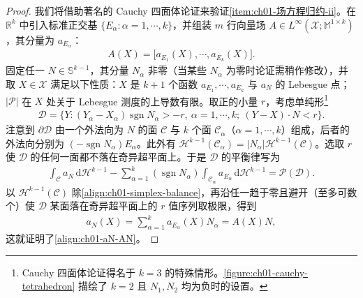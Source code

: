 \documentclass[../../main.tex]{subfiles}
\begin{document}
\begin{proof}
我们将借助著名的 Cauchy 四面体论证来验证\cref{item:ch01-场方程归约-ii}。在 $\mathbb{R}^{k}$ 中引入标准正交基 $\{E_{\alpha}:\alpha=1,\cdots,k\}$，并组装 $m$ 行向量场 $A\in L^{\infty}(\mathscr{X};\mathbb{M}^{1\times k})$，其分量为 $a_{E_{\alpha}}$：
\begin{align}
A(X)=\bigl[a_{E_{1}}(X),\cdots,a_{E_{k}}(X)\bigr].\label{align:ch01-A-components}
\end{align}
固定任一 $N\in\mathbb{S}^{k-1}$，其分量 $N_{\alpha}$ 非零（当某些 $N_{\alpha}$ 为零时论证需稍作修改），并取 $X\in\mathscr{X}$ 满足以下性质：$X$ 是 $k+1$ 个函数 $a_{E_{1}},\cdots,a_{E_{k}}$ 与 $a_{N}$ 的 Lebesgue 点；$|\mathscr{P}|$ 在 $X$ 处关于 Lebesgue 测度的上导数有限。取正的小量 $r$，考虑单纯形\footnote{Cauchy 四面体论证得名于 $k=3$ 的特殊情形。\cref{figure:ch01-cauchy-tetrahedron} 描绘了 $k=2$ 且 $N_{1},N_{2}$ 均为负时的设置。}
\begin{align}
\mathscr{D}=\{Y:(Y_{\alpha}-X_{\alpha})\operatorname{sgn}N_{\alpha}>-r,\ \alpha=1,\cdots,k;\ (Y-X)\cdot N<r\}.\label{align:ch01-simplex}
\end{align}
注意到 $\partial\mathscr{D}$ 由一个外法向为 $N$ 的面 $\mathscr{C}$ 与 $k$ 个面 $\mathscr{C}_{\alpha}$（$\alpha=1,\cdots,k$）组成，后者的外法向分别为 $(-\operatorname{sgn}N_{\alpha})E_{\alpha}$。此外有 $\mathscr{H}^{k-1}(\mathscr{C}_{\alpha})=|N_{\alpha}|\mathscr{H}^{k-1}(\mathscr{C})$。选取 $r$ 使 $\mathscr{D}$ 的任何一面都不落在奇异超平面上。于是 $\mathscr{D}$ 的平衡律写为
\begin{align}
\int_{\mathscr{C}}a_{N}\,\mathrm{d}\mathscr{H}^{k-1}-\sum_{\alpha=1}^{k}(\operatorname{sgn}N_{\alpha})\int_{\mathscr{C}_{\alpha}}a_{E_{\alpha}}\,\mathrm{d}\mathscr{H}^{k-1}=\mathscr{P}(\mathscr{D}).\label{align:ch01-simplex-balance}
\end{align}
以 $\mathscr{H}^{k-1}(\mathscr{C})$ 除\cref{align:ch01-simplex-balance}，再沿任一趋于零且避开（至多可数个）使 $\mathscr{D}$ 某面落在奇异超平面上的 $r$ 值序列取极限，得到
\begin{align}
a_{N}(X)=\sum_{\alpha=1}^{k}a_{E_{\alpha}}(X)N_{\alpha}=A(X)N,\label{align:ch01-aN-sum}
\end{align}
这就证明了\cref{align:ch01-aN-AN}。


\end{proof}
\end{document}
